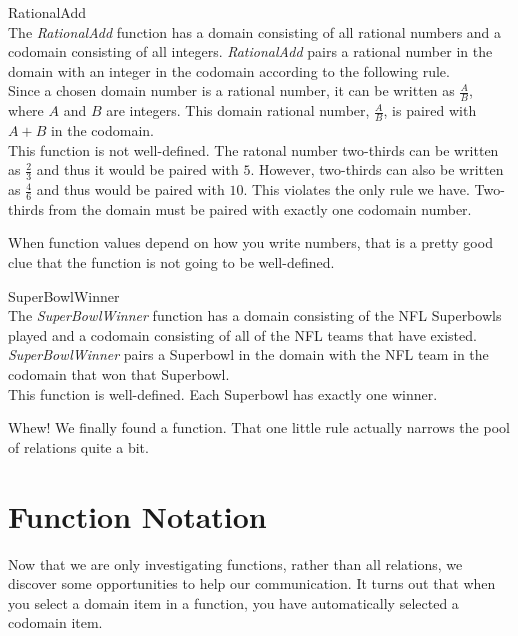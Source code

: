\documentclass{ximera}
\begin{document}
\begin{example} RationalAdd \\
The \textit{RationalAdd} function has a domain consisting of all rational numbers and a codomain consisting of all integers.  \textit{RationalAdd} pairs a rational number in the domain with an integer in the codomain according to the following rule.
\\
Since a chosen domain number is a rational number, it can be written as $\tfrac{A}{B}$, where $A$ and $B$ are integers. This domain rational number, $\tfrac{A}{B}$, is paired with $A+B$ in the codomain.
\\
This function is not well-defined.  The ratonal number two-thirds can be written as $\tfrac{2}{3}$ and thus it would be paired with $5$.  However, two-thirds can also be written as $\tfrac{4}{6}$ and thus would be paired with $10$.  This violates the only rule we have.  Two-thirds from the domain must be paired with exactly one codomain number.

\begin{warning}
When function values depend on how you write numbers, that is a pretty good clue that the function is not going to be well-defined.
\end{warning}
\end{example}



\begin{example} SuperBowlWinner  \\
The \textit{SuperBowlWinner} function has a domain consisting of the NFL Superbowls played and a codomain consisting of all of the NFL teams that have existed.  \textit{SuperBowlWinner} pairs a Superbowl in the domain with the NFL team in the codomain that won that Superbowl. 
\\
This function is well-defined. Each Superbowl has exactly one winner.
\end{example}


Whew!  We finally found a function. That one little rule actually narrows the pool of relations quite a bit.



\section{Function Notation}

Now that we are only investigating functions, rather than all relations, we discover some opportunities to help our communication.  It turns out that when you select a domain item in a function, you have automatically selected a codomain item.
\end{document}
